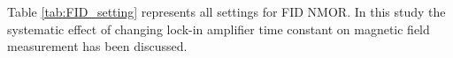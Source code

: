   Table \ref{tab:FID_setting} represents all settings for FID NMOR. In this study the systematic effect of changing lock-in amplifier time constant on magnetic field measurement has been discussed.
  
  
  
        \centering


